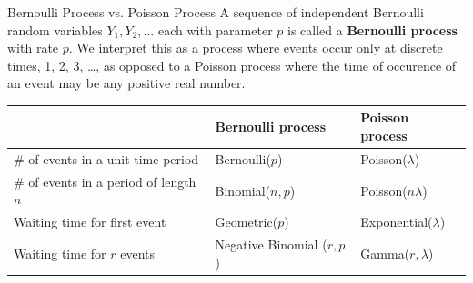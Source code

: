 \documentclass[handout]{beamer}
\renewcommand{\emph}{\textbf}
\begin{document}
%

\begin{frame}{Bernoulli Process vs. Poisson Process}
A sequence of independent Bernoulli random variables $Y_1,Y_2,\dots$ each with parameter $p$ is called a \emph{Bernoulli process} with rate $p$. We interpret this as a process where events occur only at discrete times, 1, 2, 3, \dots, as opposed to a Poisson process where the time of occurence of an event may be any positive real number.

\pause \begin{center}
\begin{tabular}{|p{2.83cm}|l|l|} \hline
& Bernoulli process & Poisson process \\ \hline
\# of events in a unit time period & Bernoulli($p$) & Poisson($\lambda$) \\ \hline
\# of events in a period of length $n$ & Binomial($n,p$) & Poisson($n\lambda$) \\ \hline \hline
Waiting time for first event & Geometric($p$) & Exponential($\lambda$) \\ \hline
Waiting time for $r$ events & Negative Binomial ($r,p$) & Gamma($r,\lambda$) \\ \hline
\end{tabular}
\end{center}
\end{frame}
\end{document}

